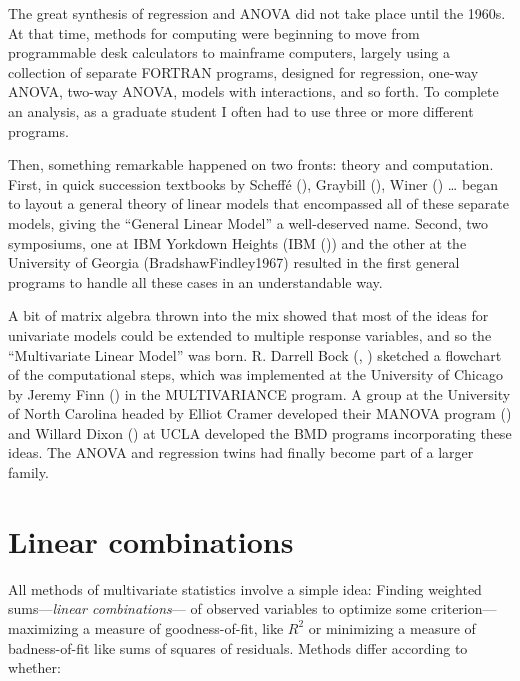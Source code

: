 \documentclass[
  letterpaper,
  10pt,
  krantz2]{krantz}
\begin{document}
\begin{tcolorbox}
The great synthesis of regression and ANOVA did not take place until the
1960s. At that time, methods for computing were beginning to move from
programmable desk calculators to mainframe computers, largely using a
collection of separate FORTRAN programs, designed for regression,
one-way ANOVA, two-way ANOVA, models with interactions, and so forth. To
complete an analysis, as a graduate student I often had to use three or
more different programs.

Then, something remarkable happened on two fronts: theory and
computation. First, in quick succession textbooks by Scheffé
(), Graybill
(), Winer
() \ldots{} began to layout a general
theory of linear models that encompassed all of these separate models,
giving the ``General Linear Model'' a well-deserved name. Second, two
symposiums, one at IBM Yorkdown Heights (IBM
()) and the other at the University of
Georgia (BradshawFindley1967) resulted in the first general programs to
handle all these cases in an understandable way.

A bit of matrix algebra thrown into the mix showed that most of the
ideas for univariate models could be extended to multiple response
variables, and so the ``Multivariate Linear Model'' was born. R. Darrell
Bock (,
) sketched a flowchart of the computational
steps, which was implemented at the University of Chicago by Jeremy Finn
() in the MULTIVARIANCE program. A group at
the University of North Carolina headed by Elliot Cramer developed their
MANOVA program () and
Willard Dixon () at UCLA developed the BMD
programs incorporating these ideas. The ANOVA and regression twins had
finally become part of a larger family.

\end{tcolorbox}

\section{Linear combinations}\label{linear-combinations}

All methods of multivariate statistics involve a simple idea: Finding
weighted sums---\emph{linear combinations}--- of observed variables to
optimize some criterion---maximizing a measure of goodness-of-fit, like
\(R^2\) or minimizing a measure of badness-of-fit like sums of squares
of residuals. Methods differ according to whether:
\end{document}
